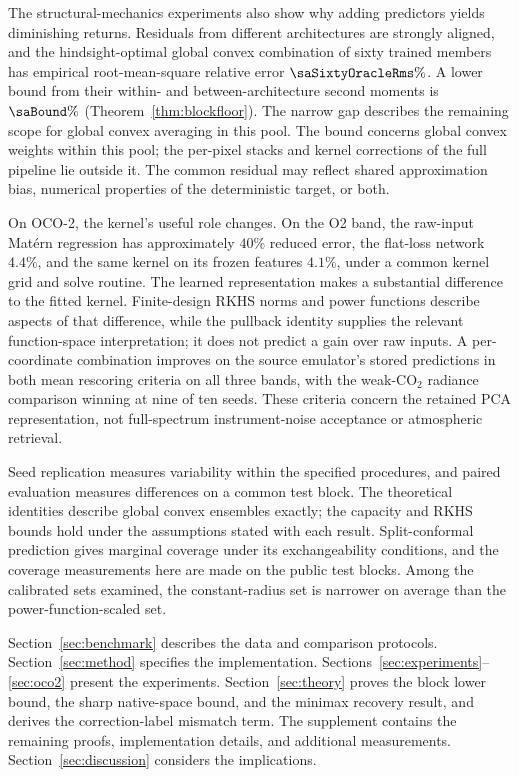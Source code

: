 The structural-mechanics experiments also show why adding predictors yields diminishing returns. Residuals from different architectures are strongly aligned, and the hindsight-optimal global convex combination of sixty trained members has empirical root-mean-square relative error $\saSixtyOracleRms\%$. A lower bound from their within- and between-architecture second moments is $\saBound\%$ (Theorem~\ref{thm:blockfloor}). The narrow gap describes the remaining scope for global convex averaging in this pool. The bound concerns global convex weights within this pool; the per-pixel stacks and kernel corrections of the full pipeline lie outside it. The common residual may reflect shared approximation bias, numerical properties of the deterministic target, or both.

On OCO-2, the kernel's useful role changes. On the O2 band, the raw-input Mat\'ern regression has approximately $40\%$ reduced error, the flat-loss network $4.4\%$, and the same kernel on its frozen features $4.1\%$, under a common kernel grid and solve routine. The learned representation makes a substantial difference to the fitted kernel. Finite-design RKHS norms and power functions describe aspects of that difference, while the pullback identity supplies the relevant function-space interpretation; it does not predict a gain over raw inputs. A per-coordinate combination improves on the source emulator's stored predictions in both mean rescoring criteria on all three bands, with the weak-CO$_2$ radiance comparison winning at nine of ten seeds. These criteria concern the retained PCA representation, not full-spectrum instrument-noise acceptance or atmospheric retrieval.

Seed replication measures variability within the specified procedures, and paired evaluation measures differences on a common test block. The theoretical identities describe global convex ensembles exactly; the capacity and RKHS bounds hold under the assumptions stated with each result. Split-conformal prediction gives marginal coverage under its exchangeability conditions, and the coverage measurements here are made on the public test blocks. Among the calibrated sets examined, the constant-radius set is narrower on average than the power-function-scaled set.

Section~\ref{sec:benchmark} describes the data and comparison protocols. Section~\ref{sec:method} specifies the implementation. Sections~\ref{sec:experiments}--\ref{sec:oco2} present the experiments. Section~\ref{sec:theory} proves the block lower bound, the sharp native-space bound, and the minimax recovery result, and derives the correction-label mismatch term. The supplement contains the remaining proofs, implementation details, and additional measurements. Section~\ref{sec:discussion} considers the implications.
